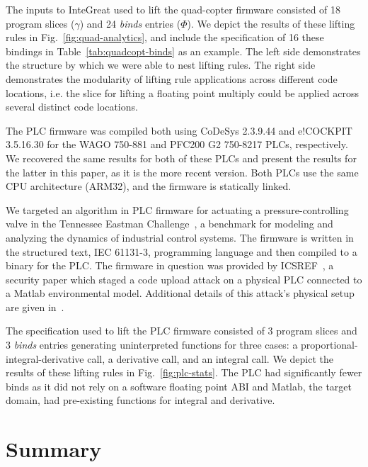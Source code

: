 The inputs to InteGreat used to lift the quad-copter firmware consisted of 18 program slices ($\gamma$) and 24 \emph{binds} entries ($\Phi$). %
We depict the results of these lifting rules in Fig.~\ref{fig:quad-analytics}, and include the specification of 16 these bindings in Table~\ref{tab:quadcopt-binds} as an example.
The left side demonstrates the structure by which we were able to nest lifting rules.
The right side demonstrates the modularity of lifting rule applications across different code locations, i.e. the slice for lifting a floating point multiply could be applied across several distinct code locations.



The PLC firmware was compiled both using CoDeSys 2.3.9.44 and e!COCKPIT 3.5.16.30 for the WAGO 750-881 and PFC200 G2 750-8217 PLCs, respectively.
We recovered the same results for both of these PLCs and present the results for the latter in this paper, as it is the more recent version.
Both PLCs use the same CPU architecture (ARM32), and the firmware is statically linked.

We targeted an algorithm in PLC firmware for actuating a pressure-controlling valve in the Tennessee Eastman Challenge~\cite{Tennessee-Eastman}, a benchmark for modeling and analyzing the dynamics of industrial control systems.
The firmware is written in the structured text, IEC 61131-3, programming language and then compiled to a binary for the PLC.
The firmware in question was provided by ICSREF~\cite{ICSREF}, a security paper which staged a code upload attack on a physical PLC connected to a Matlab environmental model.
Additional details of this attack's physical setup are given in~\cite{keliris2016machine}.

The specification used to lift the PLC firmware consisted of 3 program slices and 3 \emph{binds} entries generating uninterpreted functions for three cases: a proportional-integral-derivative call, a derivative call, and an integral call.
We depict the results of these lifting rules in Fig.~\ref{fig:plc-stats}.
The PLC had significantly fewer binds as it did not rely on a software floating point ABI and Matlab, the target domain, had pre-existing functions for integral and derivative.




\section{Summary}


